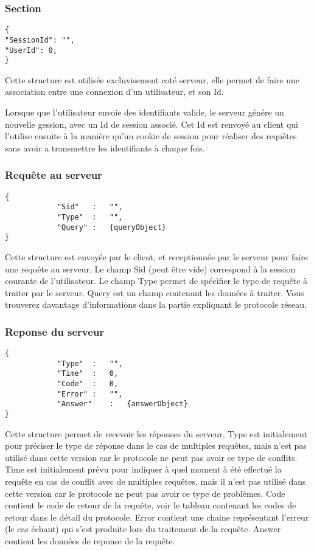 \subsubsection{Section}
\begin{lstlisting}
{
"SessionId": "",
"UserId": 0,
}
\end{lstlisting}
Cette structure est utilisée excluvisement coté serveur, elle permet de faire une association entre une connexion d'un utilisateur, et son Id.\par
Lorsque que l'utilisateur envoie des identifiants valide, le serveur génére un nouvelle gession, avec un Id de session associé. Cet Id est renvoyé au client qui l'utilise ensuite à la manière qu'un cookie de session pour réaliser des requêtes sans avoir a transmettre les identifiants à chaque fois.

\subsubsection{Requête au serveur}
\begin{lstlisting}
{
			"Sid"	:	"",
			"Type"	:	"",
			"Query"	:	{queryObject}
}
\end{lstlisting}

Cette structure est envoyée par le client, et receptionnée par le serveur pour faire une requête au serveur. Le champ \og Sid \fg (peut être vide) correspond à la session courante de l'utilisateur.
Le champ \og Type \fg permet de spécifier le type de requête à traiter par le serveur.
\og Query \fg est un champ contenant les données à traiter. Vous trouverez davantage d'informations dans la partie expliquant le protocole réseau.

\subsubsection{Reponse du serveur}
\begin{lstlisting}
{
			"Type"	:	"",
			"Time"	:	0,
			"Code"	:	0,
			"Error"	:	"",
			"Answer"	:	{answerObject}
}
\end{lstlisting}
Cette structure permet de recevoir les réponses du serveur, \og Type \fg est initialement pour préciser le type de réponse dans le cas de multiples requêtes, mais n'est pas utilisé dans cette version car le protocole ne peut pas avoir ce type de conflits. \og Time \fg est initialement prévu pour indiquer à quel moment à été effectué la requête en cas de conflit avec de multiples requêtes, mais il n'est pas utilisé dans cette version car le protocole ne peut pas avoir ce type de problèmes. \og Code \fg contient le code de retour de la requête, voir le tableau contenant les codes de retour dans le détail du protocole. \og Error \fg contient une chaine représentant l'erreur (le cas échant) qui s'est produite lors du traitement de la requête. \og Answer \fg contient les données de reponse de la requête.

% 
